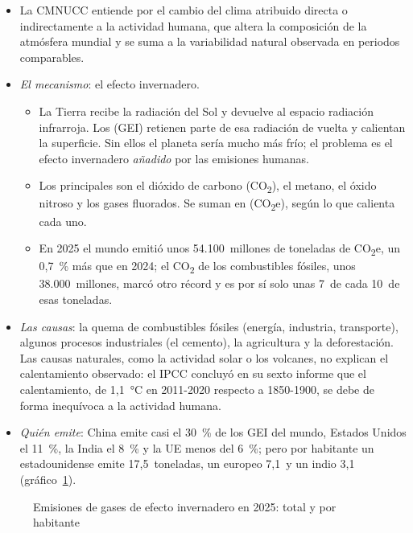 \documentclass[11pt]{article}
\begin{document}
\begin{itemize}
\item La CMNUCC entiende por  el cambio del clima atribuido directa o indirectamente a la actividad humana, que altera la composición de la atmósfera mundial y se suma a la variabilidad natural observada en periodos comparables\nocite{CMNUCC1992Convencion}.
\item \emph{El mecanismo}: el efecto invernadero.
  \begin{itemize}
  \item La Tierra recibe la radiación del Sol y devuelve al espacio radiación infrarroja. Los  (GEI) retienen parte de esa radiación de vuelta y calientan la superficie. Sin ellos el planeta sería mucho más frío; el problema es el efecto invernadero \emph{añadido} por las emisiones humanas.
  \item Los principales son el dióxido de carbono (CO\textsubscript{2}), el metano, el óxido nitroso y los gases fluorados. Se suman en  (CO\textsubscript{2}e), según lo que calienta cada uno.
  \item En 2025 el mundo emitió unos 54.100~millones de toneladas de CO\textsubscript{2}e, un 0,7~\% más que en 2024\nocite{JRC2026EDGAR}; el CO\textsubscript{2} de los combustibles fósiles, unos 38.000~millones, marcó otro récord y es por sí solo unas 7~de cada 10~de esas toneladas\nocite{GCP2025Budget,JRC2026EDGAR}.
  \end{itemize}
\item \emph{Las causas}: la quema de combustibles fósiles (energía, industria, transporte), algunos procesos industriales (el cemento), la agricultura y la deforestación. Las causas naturales, como la actividad solar o los volcanes, no explican el calentamiento observado: el IPCC concluyó en su sexto informe que el calentamiento, de 1,1~°C en 2011-2020 respecto a 1850-1900, se debe de forma inequívoca a la actividad humana\nocite{IPCC2023SYR}.
\item \emph{Quién emite}: China emite casi el 30~\% de los GEI del mundo, Estados Unidos el 11~\%, la India el 8~\% y la UE menos del 6~\%; pero por habitante un estadounidense emite 17,5~toneladas, un europeo 7,1~y un indio 3,1\nocite{JRC2026EDGAR} (gráfico~\ref{fig:emisiones-paises}).
\end{itemize}

\begin{figure}[H]
\centering
\caption{Emisiones de gases de efecto invernadero en 2025: total y por habitante}\label{fig:emisiones-paises}
\end{figure}
\end{document}
